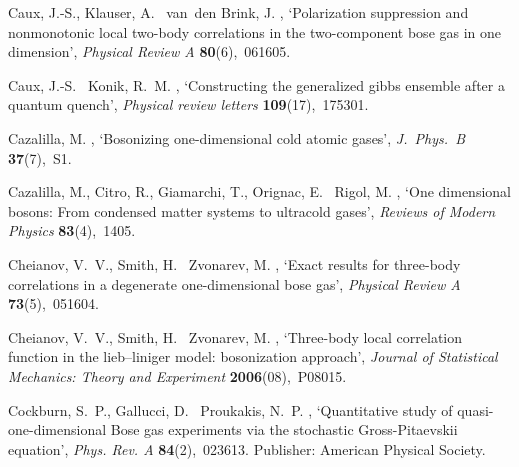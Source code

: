 \documentclass[onecolumn,amsfonts,showpacs,superscriptaddress]{revtex4-1}
\begin{document}
\begin{thebibliography}{xx}
Caux, J.-S., Klauser, A. \harvardand\ van~den Brink, J.  \harvardyearright , `Polarization suppression and nonmonotonic local
  two-body correlations in the two-component bose gas in one dimension', {\em
  Physical Review A} {\bf 80}(6),~061605.

Caux, J.-S. \harvardand\ Konik, R.~M.  \harvardyearright ,
  `Constructing the generalized gibbs ensemble after a quantum quench', {\em
  Physical review letters} {\bf 109}(17),~175301.

Cazalilla, M.  \harvardyearright , `Bosonizing
  one-dimensional cold atomic gases', {\em J.~Phys.~B} {\bf 37}(7),~S1.

Cazalilla, M., Citro, R., Giamarchi, T., Orignac, E. \harvardand\ Rigol, M.
  \harvardyearright , `One dimensional bosons: From
  condensed matter systems to ultracold gases', {\em Reviews of Modern Physics}
  {\bf 83}(4),~1405.

Cheianov, V.~V., Smith, H. \harvardand\ Zvonarev, M.  \harvardyearright , `Exact results for three-body correlations in a
  degenerate one-dimensional bose gas', {\em Physical Review A} {\bf
  73}(5),~051604.

Cheianov, V.~V., Smith, H. \harvardand\ Zvonarev, M.  \harvardyearright , `Three-body local correlation function in the
  lieb--liniger model: bosonization approach', {\em Journal of Statistical
  Mechanics: Theory and Experiment} {\bf 2006}(08),~P08015.

Cockburn, S.~P., Gallucci, D. \harvardand\ Proukakis, N.~P.  \harvardyearleft
  2011\harvardyearright , `Quantitative study of quasi-one-dimensional {Bose}
  gas experiments via the stochastic {Gross}-{Pitaevskii} equation', {\em Phys.
  Rev. A} {\bf 84}(2),~023613.
\newblock Publisher: American Physical Society.


\end{thebibliography}
\end{document}
